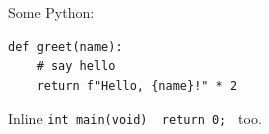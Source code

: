 \documentclass{article}
\begin{document}
Some Python:
\begin{verbatim}
def greet(name):
    # say hello
    return f"Hello, {name}!" * 2
\end{verbatim}
Inline \texttt{int main(void) { return 0; }} too.
\end{document}
